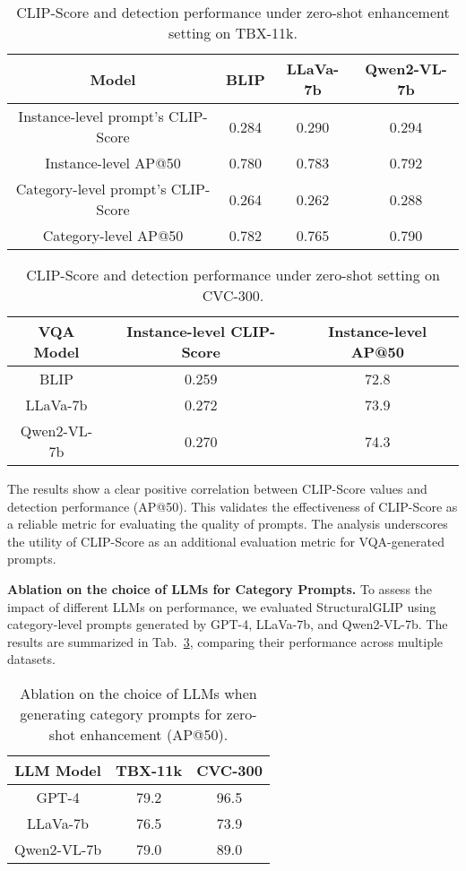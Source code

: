 \begin{table}[ht]
\centering
\caption{CLIP-Score and detection performance under zero-shot enhancement setting on TBX-11k.}
\label{tab:clipscore-prompt-tbx11k}
\begin{tabular}{cccc}\toprule
{Model} & {BLIP} & {LLaVa-7b} & {Qwen2-VL-7b}  \\
\toprule
{Instance-level prompt's CLIP-Score} & 0.284 & 0.290 & 0.294 \\
{Instance-level AP@50} & 0.780 & 0.783 & 0.792 \\

{Category-level prompt's CLIP-Score} & 0.264 & 0.262 & 0.288 \\
{Category-level AP@50} & 0.782 & 0.765 & 0.790 \\
\bottomrule
\end{tabular}
\end{table}
\begin{table}[ht]
\centering
\caption{CLIP-Score and detection performance under zero-shot setting on CVC-300.}
\label{tab:clipscore-prompt-cvc300}
\begin{tabular}{ccc}
\toprule
{VQA Model} & {Instance-level CLIP-Score} & {Instance-level AP@50} \\
\toprule
{BLIP} & 0.259 & 72.8 \\
{LLaVa-7b} & 0.272 & 73.9 \\
{Qwen2-VL-7b} & 0.270 & 74.3 \\
\bottomrule
\end{tabular}
\end{table}

The results show a clear positive correlation between CLIP-Score values and detection performance (AP@50). This validates the effectiveness of CLIP-Score as a reliable metric for evaluating the quality of prompts. The analysis underscores the utility of CLIP-Score as an additional evaluation metric for VQA-generated prompts.


\textbf{Ablation on the choice of LLMs for Category Prompts.} To assess the impact of different LLMs on performance, we evaluated StructuralGLIP using category-level prompts generated by GPT-4, LLaVa-7b, and Qwen2-VL-7b. The results are summarized in Tab.~\ref{tab:abl-prompt-model}, comparing their performance across multiple datasets.

\begin{table}[ht]
\centering
\caption{Ablation on the choice of LLMs when generating category prompts for zero-shot enhancement (AP@50).}
\label{tab:abl-prompt-model}
\begin{tabular}{ccc}
\toprule
{LLM Model} & {TBX-11k} & {CVC-300} \\
\toprule
{GPT-4} & 79.2 & 96.5 \\
{LLaVa-7b} & 76.5 & 73.9 \\
{Qwen2-VL-7b} & 79.0 & 89.0 \\
\bottomrule
\end{tabular}
\end{table}

